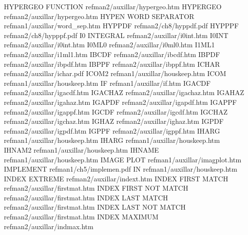 HYPERGEO FUNCTION                       refman2/auxillar/hypergeo.htm
HYPERGEO                                refman2/auxillar/hypergeo.htm
HYPEN WORD SEPARATOR                    refman1/auxillar/word_sep.htm
HYPPDF                                  refman2/ch8/hyppdf.pdf
HYPPPF                                  refman2/ch8/hypppf.pdf
I0 INTEGRAL                             refman2/auxillar/i0int.htm
I0INT                                   refman2/auxillar/i0int.htm
I0ML0                                   refman2/auxillar/i0ml0.htm
I1ML1                                   refman2/auxillar/i1ml1.htm
IBCDF                                   refman2/auxillar/ibcdf.htm
IBPDF                                   refman2/auxillar/ibpdf.htm
IBPPF                                   refman2/auxillar/ibppf.htm
ICHAR                                   refman2/auxillar/ichar.pdf
ICOM2                                   refman1/auxillar/houskeep.htm
ICOM                                    refman1/auxillar/houskeep.htm
IF                                      refman1/auxillar/if.htm
IGACDF                                  refman2/auxillar/igacdf.htm
IGACHAZ                                 refman2/auxillar/igachaz.htm
IGAHAZ                                  refman2/auxillar/igahaz.htm
IGAPDF                                  refman2/auxillar/igapdf.htm
IGAPPF                                  refman2/auxillar/igappf.htm
IGCDF                                   refman2/auxillar/igcdf.htm
IGCHAZ                                  refman2/auxillar/igchaz.htm
IGHAZ                                   refman2/auxillar/ighaz.htm
IGPDF                                   refman2/auxillar/igpdf.htm
IGPPF                                   refman2/auxillar/igppf.htm
IHARG                                   refman1/auxillar/houskeep.htm
IHARG                                   refman1/auxillar/houskeep.htm
IHNAM2                                  refman1/auxillar/houskeep.htm
IHNAME                                  refman1/auxillar/houskeep.htm
IMAGE PLOT                              refman1/auxillar/imagplot.htm
IMPLEMENT                               refman1/ch5/implemen.pdf
IN                                      refman1/auxillar/houskeep.htm
INDEX EXTREME                           refman2/auxillar/indext.htm
INDEX FIRST MATCH                       refman2/auxillar/firstmat.htm
INDEX FIRST NOT MATCH                   refman2/auxillar/firstmat.htm
INDEX LAST MATCH                        refman2/auxillar/firstmat.htm
INDEX LAST NOT MATCH                    refman2/auxillar/firstmat.htm
INDEX MAXIMUM                           refman2/auxillar/indmax.htm
